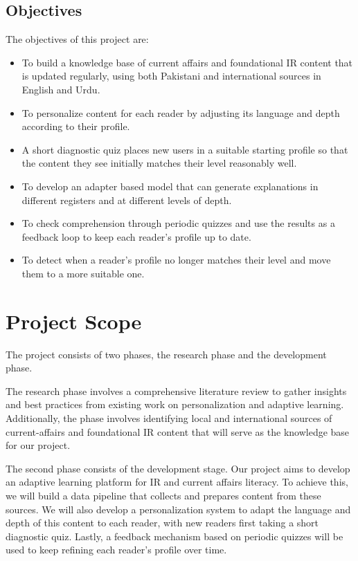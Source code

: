 \documentclass{FastFyp}
\begin{document}
\subsection{Objectives}
The objectives of this project are:
\begin{itemize}
    \item To build a knowledge base of current affairs and foundational IR content that is updated regularly, using both Pakistani and international sources in English and Urdu.
    \item To personalize content for each reader by adjusting its language and depth according to their profile.
    \item A short diagnostic quiz places new users in a suitable starting profile so that the content they see initially matches their level reasonably well.
    \item To develop an adapter based model that can generate explanations in different registers and at different levels of depth.
    \item To check comprehension through periodic quizzes and use the results as a feedback loop to keep each reader's profile up to date.
    \item To detect when a reader's profile no longer matches their level and move them to a more suitable one.
\end{itemize}

\section{Project Scope}
The project consists of two phases, the research phase and the development phase.

The research phase involves a comprehensive literature review to gather insights and best practices from existing work on personalization and adaptive learning. Additionally, the phase involves identifying local and international sources of current-affairs and foundational IR content that will serve as the knowledge base for our project.

The second phase consists of the development stage. Our project aims to develop an adaptive learning platform for IR and current affairs literacy. To achieve this, we will build a data pipeline that collects and prepares content from these sources. We will also develop a personalization system to adapt the language and depth of this content to each reader, with new readers first taking a short diagnostic quiz. Lastly, a feedback mechanism based on periodic quizzes will be used to keep refining each reader’s profile over time.
\end{document}
